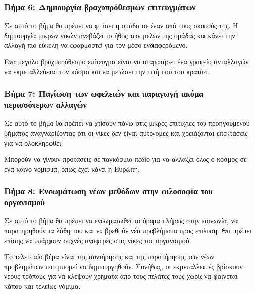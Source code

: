 \subsubsection{Βήμα 6: Δημιουργία βραχυπρόθεσμων επιτευγμάτων}

\begin{problem}
  Σε αυτό το βήμα θα πρέπει να φτάσει η ομάδα σε έναν από τους σκοπούς της. Η δημιουργία μικρών νικών ανεβάζει το ήθος των μελών της ομάδας και κάνει την αλλαγή πιο εύκολη να εφαρμοστεί για τον μέσο ενδιαφερόμενο.
\end{problem}

Ένα μεγάλο βραχυπρόθεσμο επίτευγμα είναι να σταματήσει ένα γραφείο ανταλλαγών να εκμεταλλεύεται τον κόσμο και να μειώσει την τιμή που του κρατάει.

\subsubsection{Βήμα 7: Παγίωση των ωφελειών και παραγωγή ακόμα περισσότερων αλλαγών}

\begin{problem}
  Σε αυτό το βήμα θα πρέπει να χτίσουν πάνω στις μικρές επιτυχίες του προηγούμενου βήματος αναγνωρίζοντας ότι οι νίκες δεν είναι αυτόνομες και χρειάζονται επεκτάσεις για να ολοκληρωθεί.
\end{problem}

Μπορούν να γίνουν προτάσεις σε παγκόσμιο πεδίο για να αλλάξει όλος ο κόσμος σε ένα κοινό νόμισμα, όπως έχει κάνει η Ευρώπη.

\subsubsection{Βήμα 8: Ενσωμάτωση νέων μεθόδων στην φιλοσοφία του οργανισμού}

\begin{problem}
  Σε αυτό το βήμα θα πρέπει να ενσωματωθεί το όραμα πλήρως στην κοινωνία, να παρατηρηθούν τα λάθη του και να βρεθούν νέα προβλήματα προς επίλυση. Θα πρέπει επίσης να υπάρχουν συχνές αναφορές στις νίκες του οργανισμού.
\end{problem}

Το τελευταίο βήμα είναι της συντήρησης και της παρατήρησης των νέων προβλημάτων που μπορεί να δημιουργηθούν. Συνήθως, οι εκμεταλλευτές βρίσκουν νέους τρόπους για να κλέψουν χρήματα από τους πελάτες τους χωρίς να φαίνεται κάπου και τελείως νόμιμα.